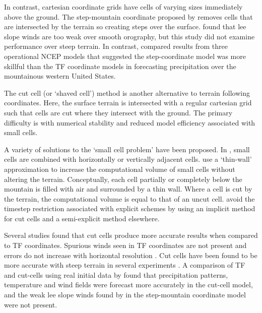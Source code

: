 In contrast, cartesian coordinate grids have cells of varying sizes immediately above the ground.  The step-mountain coordinate proposed by \textcite{mesinger1988} removes cells that are intersected by the terrain so creating steps over the surface.    \textcite{gallus-klemp2000} found that lee slope winds are too weak over smooth orography, but this study did not examine performance over steep terrain.  In contrast, \textcite{mesinger2004} compared results from three operational NCEP models that suggested the step-coordinate model was more skillful than the TF coordinate models in forecasting precipitation over the mountainous western United States.


The cut cell (or `shaved cell')  method is another alternative to terrain following coordinates.  Here, the surface terrain is intersected with a regular cartesian grid such that cells are cut where they intersect with the ground.   The primary difficulty is with numerical stability and reduced model efficiency associated with small cells. 

A variety of solutions to the `small cell problem' have been proposed.  In \textcite{yamazaki-satomura2010}, small cells are combined with horizontally or vertically adjacent cells.     \textcite{steppeler2002} use a `thin-wall' approximation to increase the computational volume of small cells without altering the terrain.  Conceptually, each cell partially or completely below the mountain is filled with air and surrounded by a thin wall.  Where a cell is cut by the terrain, the computational volume is equal to that of an uncut cell.  \textcite{jebens2011} avoid the timestep restriction associated with explicit schemes by using an implicit method for cut cells and a semi-explicit method elsewhere.

Several studies found that cut cells produce more accurate results when compared to TF coordinates.  Spurious winds seen in TF coordinates are not present and errors do not increase with horizontal resolution \autocite{good2013}.  Cut cells have been found to be more accurate with steep terrain in several experiments \parencites{good2013}{yamazaki-satomura2010}.  A comparison of TF and cut-cells using real initial data by \textcite{steppeler2006} found that precipitation patterns, temperature and wind fields were forecast more accurately in the cut-cell model, and the weak lee slope winds found by \textcite{gallus-klemp2000} in the step-mountain coordinate model were not present.  

